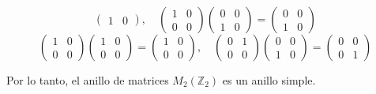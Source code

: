 \begin{enumerate}
\[\begin{pmatrix}
1 & 0
\end{pmatrix}
, \quad
\begin{pmatrix}
1 & 0 \\
0 & 0
\end{pmatrix}
\begin{pmatrix}
0 & 0 \\
1 & 0
\end{pmatrix}
=
\begin{pmatrix}
0 & 0 \\
1 & 0
\end{pmatrix}
\]
\[
\begin{pmatrix}
1 & 0 \\
0 & 0
\end{pmatrix}
\begin{pmatrix}
1 & 0 \\
0 & 0
\end{pmatrix}
=
\begin{pmatrix}
1 & 0 \\
0 & 0
\end{pmatrix}
, \quad
\begin{pmatrix}
0 & 1 \\
0 & 0
\end{pmatrix}
\begin{pmatrix}
0 & 0 \\
1 & 0
\end{pmatrix}
=
\begin{pmatrix}
0 & 0 \\
0 & 1
\end{pmatrix}
\]

Por lo tanto, el anillo de matrices $M_2(\mathbb{Z}_2)$ es un anillo simple.
    
\end{enumerate}










